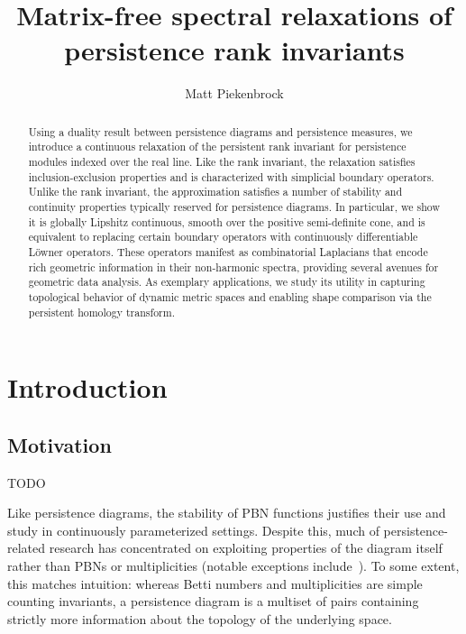 \documentclass[12pt]{article}
\title{\vspace{-2.0em} 
Matrix-free spectral relaxations of \\ persistence rank invariants
\vspace{-0.5em}}
\author{Matt Piekenbrock}
\date{}
\numberwithin{equation}{section}
\newcommand{\+}{%
	\raisebox{0.18ex}{\scaleobj{0.55}{+}}
}
\theoremstyle{definition}
\begin{document}
\maketitle

\begin{abstract}
Using a duality result between persistence diagrams and persistence measures, we introduce a continuous relaxation of the persistent rank invariant for persistence modules indexed over the real line. Like the rank invariant, the relaxation satisfies inclusion-exclusion properties and is characterized with simplicial boundary operators. 
Unlike the rank invariant, the approximation satisfies a number of stability and continuity properties typically reserved for persistence diagrams. In particular, we show it is globally Lipshitz continuous, smooth over the positive semi-definite cone, and is equivalent to replacing certain boundary operators with continuously differentiable L{\"o}wner operators. 
These operators manifest as combinatorial Laplacians that encode rich geometric information in their non-harmonic spectra, providing several avenues for geometric data analysis. 
As exemplary applications, we study its utility in capturing topological behavior of dynamic metric spaces and enabling shape comparison via the persistent homology transform.
\end{abstract}

\section{Introduction}\label{sec:intro}
\subsection*{Motivation} TODO 

Like persistence diagrams, the stability of PBN functions justifies their use and study in continuously parameterized settings. Despite this, much of persistence-related research has concentrated on exploiting properties of the diagram itself~\cite{} rather than PBNs or multiplicities (notable exceptions include~\cite{cerri2013betti, chen2011output}). 
To some extent, this matches intuition: whereas Betti numbers and multiplicities are simple counting invariants, a persistence diagram is a multiset of pairs containing strictly more information about the topology of the underlying space. 
\end{document}
